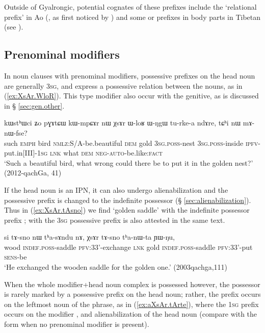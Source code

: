 Outside of Gyalrongic, potential cognates of these prefixes include the `relational prefix'  in Ao (\citealt[84-85]{coupe07mongsen}, as first noticed by \citealt[141-2]{wolfenden29outlines}) and some  or  prefixes in body parts in Tibetan (see \citealt{jacques14snom}).

\subsection{Prenominal modifiers} \label{sec:possessive.prefixes.prenominal}
In noun clauses with prenominal modifiers, possessive prefixes on the head noun are generally \textsc{3sg}, and express a possessive relation between the nouns, as in (\ref{ex:XsAr.WloR}).  This type modifier also occur with the genitive, as is discussed in § \ref{sec:gen.other}.

\begin{exe}
\ex \label{ex:XsAr.WloR}
\gll kɯstʰɯci ʑo pɣɤtɕɯ kɯ-mpɕɤr nɯ χsɤr ɯ-loʁ ɯ-ŋgɯ tu-rke-a ndɤre, tɕʰi nɯ mɤ-nɯ-fse? \\
such \textsc{emph} bird \textsc{nmlz}:S/A-be.beautiful \textsc{dem} gold \textsc{3sg}.\textsc{poss}-nest \textsc{3sg}.\textsc{poss}-inside \textsc{ipfv}-put.in[III]-\textsc{1sg} \textsc{lnk} what \textsc{dem} \textsc{neg}-\textsc{auto}-be.like:\textsc{fact} \\
\glt `Such a beautiful bird, what wrong could there be to put it in the golden nest?' (2012-qachGa, 41)
\end{exe}

If the head noun is an IPN, it can also undergo alienabilization and the possessive prefix is changed to the indefinite possessor (§ \ref{sec:alienabilization}). Thus in (\ref{ex:XsAr.tAsno}) we find  `golden saddle' with the indefinite possessor prefix ;  with the \textsc{3sg} possessive prefix is also attested in the same text.

\begin{exe}
\ex \label{ex:XsAr.tAsno}
\gll si tɤ-sno nɯ tʰa-sɤndu nɤ, χsɤr tɤ-sno tʰa-nɯ-ta ɲɯ-ŋu, \\
wood \textsc{indef}.\textsc{poss}-saddle \textsc{pfv}:3\fl{}3'-exchange \textsc{lnk} gold  \textsc{indef}.\textsc{poss}-saddle \textsc{pfv}:3\fl{}3'-put \textsc{sens}-be \\
\glt `He exchanged the wooden saddle for the golden one.' (2003qachga,111)
\end{exe}

When the whole modifier+head noun complex is possessed however, the possessor is rarely marked by a possessive prefix on the head noun; rather, the prefix occurs on the leftmost noun of the phrase, as in (\ref{ex:aXsAr.tArte}), where the \textsc{1sg} prefix  occurs on the modifier , and alienabilization of the head noun  (compare with the form  when no prenominal modifier is present). %

